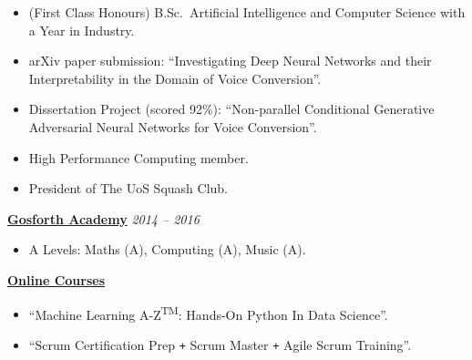 \documentclass[10pt]{article} %
\begin{document}
\begin{changemargin}{0pt}{0.5pt}
\begin{minipage}[t]{0.44\textwidth}
\begin{changemargin}{5pt}{5pt}
\begin{itemize} \itemsep-2pt %
  \item (First Class Honours) B.Sc.\ Artificial Intelligence and Computer Science with a Year in Industry.
  \item arXiv paper submission: \enquote{Investigating Deep Neural Networks and their Interpretability in the Domain of Voice Conversion}.
  \item Dissertation Project (scored 92\%): \enquote{Non-parallel Conditional Generative Adversarial Neural Networks for Voice Conversion}.
  \item High Performance Computing member.
  \item President of The UoS Squash Club.
\end{itemize}


\vspace{5pt}
\underline{\textbf{Gosforth Academy}} \hfill \textit{ 2014 --  2016}\\
\par
\vspace{-15pt}

\begin{itemize} \itemsep-2pt %
	\item A Levels: Maths (A), Computing (A), Music (A).
\end{itemize}

	
\vspace{5pt}
\underline{\textbf{Online Courses}}\\
\par
\vspace{-15pt}

\begin{itemize} \itemsep-2pt %
	\item \enquote{Machine Learning A-Z\textsuperscript{TM}: Hands-On Python In Data Science}.
	\item \enquote{Scrum Certification Prep \texttt{+} Scrum Master \texttt{+} Agile Scrum Training}.
\end{itemize}
	

\end{changemargin}
\end{minipage}
\end{changemargin}
\end{document}
